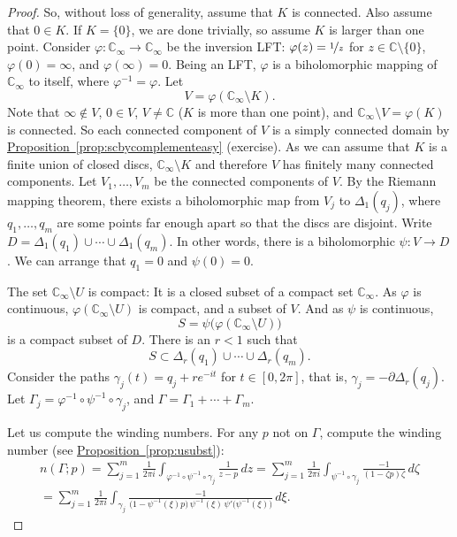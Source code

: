 \documentclass[12pt,openany]{book}
\newcommand{\C}{{\mathbb{C}}}
\theoremstyle{plain}
\theoremstyle{remark}
\theoremstyle{definition}
\theoremstyle{exercise}
\theoremstyle{example}
\newcommand{\propref}[1]{\hyperref[#1]{Proposition~\ref*{#1}}}
\begin{document}
\begin{proof}
So, without loss of generality, assume that $K$ is connected.
Also assume that $0 \in K$.  If $K= \{0 \}$, we are done trivially, so
assume $K$ is larger than one point.
Consider $\varphi \colon \C_\infty \to \C_\infty$ be the inversion
LFT\@:
$\varphi(z) = \nicefrac{1}{z}$ for $z \in \C \setminus \{ 0 \}$,
$\varphi(0) = \infty$, and $\varphi(\infty) = 0$.
Being an LFT\@, $\varphi$ is a biholomorphic
mapping of $\C_\infty$ to itself, where $\varphi^{-1} = \varphi$.  Let
\begin{equation*}
V = \varphi(\C_\infty \setminus K) .
\end{equation*}
Note that $\infty \notin V$, $0 \in V$, $V \not= \C$ ($K$ is more than one
point), and
$\C_\infty \setminus V = \varphi(K)$ is connected.
So each connected component of $V$ is a simply connected domain
by \propref{prop:scbycomplementeasy} (exercise).
As we can assume that $K$ is a finite union of closed discs,
$\C_\infty \setminus K$ and therefore $V$ has finitely many connected components.
Let $V_1,\ldots,V_m$ be the connected
components of $V$.
By the Riemann mapping theorem, there exists
a biholomorphic map from $V_j$ to $\Delta_1(q_j)$,
where $q_1,\ldots,q_m$ are some points
far enough apart so that the discs are disjoint.
Write $D = \Delta_1(q_1) \cup \cdots \cup \Delta_1(q_m)$.
In other words, there is
a biholomorphic $\psi \colon V \to D$.  We can arrange that $q_1=0$
and $\psi(0)=0$.

The set $\C_\infty \setminus U$ is compact: It is a closed subset of
a compact set $\C_\infty$.  As $\varphi$ is continuous,
$\varphi(\C_\infty \setminus U)$ is compact, and a subset of $V$.
And as $\psi$ is continuous,
\begin{equation*}
S = \psi\bigl(\varphi(\C_\infty \setminus U)\bigr)
\end{equation*}
is a compact subset of $D$.  There is an $r < 1$ such that
\begin{equation*}
S \subset \Delta_r(q_1) \cup \cdots \cup \Delta_r(q_m) .
\end{equation*}
Consider the paths $\gamma_j(t) = q_j + r e^{-it}$ for $t \in
[0,2\pi]$,
that is, $\gamma_j = -\partial
\Delta_r(q_j)$.
Let $\Gamma_j=\varphi^{-1} \circ \psi^{-1} \circ \gamma_j$, and $\Gamma = \Gamma_1 +
\cdots + \Gamma_m$.

Let us compute the winding numbers.
For any $p$ not on $\Gamma$, compute
the winding number (see \propref{prop:usubst}):
\begin{multline*}
n(\Gamma;p) = 
\sum_{j=1}^m
\frac{1}{2\pi i}
\int_{\varphi^{-1} \circ \psi^{-1} \circ \gamma_j}
\frac{1}{z-p} \, dz
=
\sum_{j=1}^m
\frac{1}{2\pi i}
\int_{\psi^{-1} \circ \gamma_j}
\frac{-1}{(1-\zeta p) \zeta} \, d\zeta
\\
=
\sum_{j=1}^m
\frac{1}{2\pi i}
\int_{\gamma_j}
\frac{-1}{ \bigl( 1-\psi^{-1}(\xi)p \bigr)
\,
\psi^{-1}(\xi)
\,
\psi' \bigl(\psi^{-1}(\xi)\bigr)} \, d \xi .
\end{multline*}


\end{proof}
\end{document}

